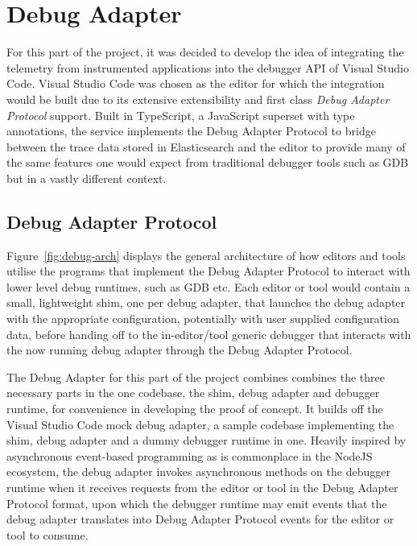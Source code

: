 \documentclass[12pt,pdftex,titlepage]{report}
\begin{document}
        \section{Debug Adapter}
            For this part of the project, it was decided to develop the idea of integrating the telemetry from instrumented applications into the debugger API of Visual Studio Code.
            Visual Studio Code was chosen as the editor for which the integration would be built due to its extensive extensibility and first class \textit{Debug Adapter Protocol}\cite{dap} 
            support. Built in TypeScript, a JavaScript superset with type annotations, the service implements the Debug Adapter Protocol to bridge between the trace data stored in Elasticsearch
            and the editor to provide many of the same features one would expect from traditional debugger tools such as GDB but in a vastly different context.

            \subsection{Debug Adapter Protocol}
                Figure~\ref{fig:debug-arch} displays the general architecture of how editors and tools utilise the programs that implement the Debug Adapter Protocol to interact with
                lower level debug runtimes, such as GDB etc. Each editor or tool would contain a small, lightweight shim, one per debug adapter, that launches the debug adapter with the
                appropriate configuration, potentially with user supplied configuration data, before handing off to the in-editor/tool generic debugger that interacts with the now running
                debug adapter through the Debug Adapter Protocol.

                The Debug Adapter for this part of the project combines combines the three necessary parts in the one codebase, the shim, debug adapter and debugger runtime, for convenience
                in developing the proof of concept. It builds off the Visual Studio Code mock debug adapter\cite{mockdebug}, a sample codebase implementing the shim, debug adapter and a dummy debugger
                runtime in one. Heavily inspired by asynchronous event-based programming as is commonplace in the NodeJS ecosystem, the debug adapter invokes asynchronous methods on the 
                debugger runtime when it receives requests from the editor or tool in the Debug Adapter Protocol format, upon which the debugger runtime may emit events that the debug adapter
                translates into Debug Adapter Protocol events for the editor or tool to consume.
\end{document}

